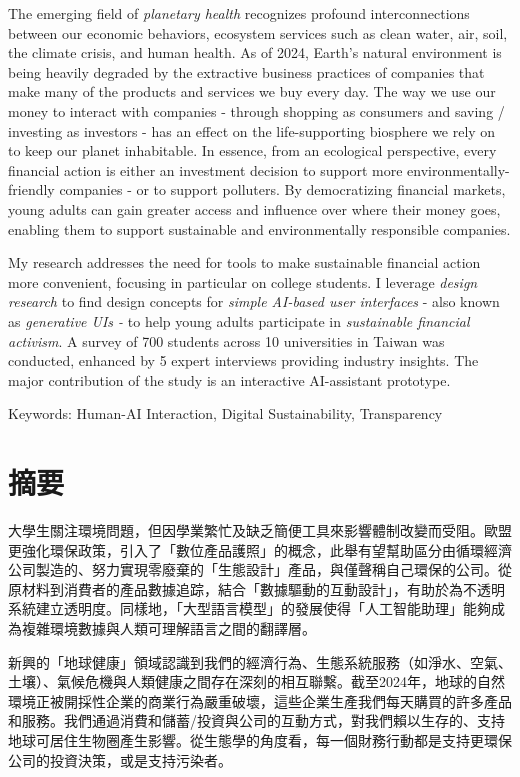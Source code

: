 \documentclass[
  letterpaper,
  DIV=11,
  numbers=noendperiod]{scrartcl}
\begin{document}
The emerging field of \emph{planetary health} recognizes profound
interconnections between our economic behaviors, ecosystem services such
as clean water, air, soil, the climate crisis, and human health. As of
2024, Earth's natural environment is being heavily degraded by the
extractive business practices of companies that make many of the
products and services we buy every day. The way we use our money to
interact with companies - through shopping as consumers and saving /
investing as investors - has an effect on the life-supporting biosphere
we rely on to keep our planet inhabitable. In essence, from an
ecological perspective, every financial action is either an investment
decision to support more environmentally-friendly companies - or to
support polluters. By democratizing financial markets, young adults can
gain greater access and influence over where their money goes, enabling
them to support sustainable and environmentally responsible companies.

My research addresses the need for tools to make sustainable financial
action more convenient, focusing in particular on college students. I
leverage \emph{design research} to find design concepts for \emph{simple
AI-based user interfaces} - also known as \emph{generative UIs -} to
help young adults participate in \emph{sustainable financial activism}.
A survey of 700 students across 10 universities in Taiwan was conducted,
enhanced by 5 expert interviews providing industry insights. The major
contribution of the study is an interactive AI-assistant prototype.

Keywords: Human-AI Interaction, Digital Sustainability, Transparency

\newpage

\section{摘要}\label{ux6458ux8981}

大學生關注環境問題，但因學業繁忙及缺乏簡便工具來影響體制改變而受阻。歐盟更強化環保政策，引入了「數位產品護照」的概念，此舉有望幫助區分由循環經濟公司製造的、努力實現零廢棄的「生態設計」產品，與僅聲稱自己環保的公司。從原材料到消費者的產品數據追踪，結合「數據驅動的互動設計」，有助於為不透明系統建立透明度。同樣地，「大型語言模型」的發展使得「人工智能助理」能夠成為複雜環境數據與人類可理解語言之間的翻譯層。

新興的「地球健康」領域認識到我們的經濟行為、生態系統服務（如淨水、空氣、土壤）、氣候危機與人類健康之間存在深刻的相互聯繫。截至2024年，地球的自然環境正被開採性企業的商業行為嚴重破壞，這些企業生產我們每天購買的許多產品和服務。我們通過消費和儲蓄/投資與公司的互動方式，對我們賴以生存的、支持地球可居住生物圈產生影響。從生態學的角度看，每一個財務行動都是支持更環保公司的投資決策，或是支持污染者。
\end{document}
